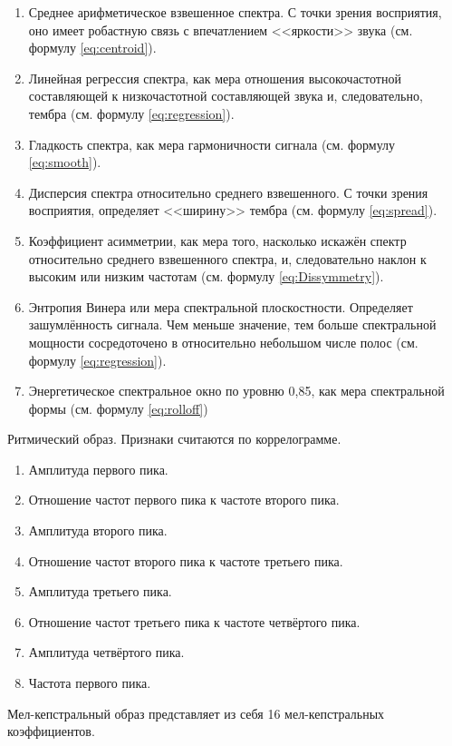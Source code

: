 \begin{enumerate}[label=\arabic*.]
\item Среднее арифметическое взвешенное спектра. С точки зрения восприятия, оно имеет робастную связь с впечатлением <<яркости>> звука (см. формулу \ref{eq:centroid}).
\item Линейная регрессия спектра, как мера отношения высокочастотной составляющей к низкочастотной составляющей звука и, следовательно, тембра (см. формулу \ref{eq:regression}).
\item Гладкость спектра, как мера гармоничности сигнала (см. формулу \ref{eq:smooth}).
\item Дисперсия спектра относительно среднего взвешенного. С точки зрения восприятия, определяет <<ширину>> тембра (см. формулу \ref{eq:spread}).
\item Коэффициент асимметрии, как мера того, насколько искажён спектр относительно среднего взвешенного спектра, и, следовательно наклон к высоким или низким частотам (см. формулу \ref{eq:Dissymmetry}).
\item Энтропия Винера или мера спектральной плоскостности. Определяет зашумлённость сигнала. Чем меньше значение, тем больше спектральной мощности сосредоточено в относительно небольшом числе полос (см. формулу \ref{eq:regression}).
\item Энергетическое спектральное окно по уровню 0,85, как мера спектральной формы (см. формулу \ref{eq:rolloff})
\end{enumerate}

Ритмический образ.
Признаки считаются по коррелограмме.
\begin{enumerate}[label=\arabic*.]
\item Амплитуда первого пика.
\item Отношение частот первого пика к частоте второго пика.
\item Амплитуда второго пика.
\item Отношение частот второго пика к частоте третьего пика.
\item Амплитуда третьего пика.
\item Отношение частот третьего пика к частоте четвёртого пика.
\item Амплитуда четвёртого пика.
\item Частота первого пика.
\end{enumerate}

Мел-кепстральный образ представляет из себя 16 мел-кепстральных коэффициентов.

